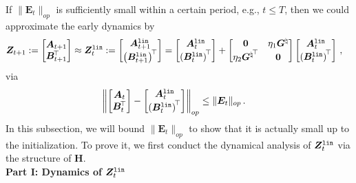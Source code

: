 If $\|\bm E_t\|_{op}$ is sufficiently small within a certain period, e.g., $t \leq T$, then we could approximate the early dynamics by
\begin{align*}
 \bm Z_{t+1} :=
    \begin{bmatrix}
       \bm A_{t+1} \\ \bm B_{t+1}^{\!\top}
    \end{bmatrix} & \approx \bm Z^{\tt lin}_t := \begin{bmatrix}
    \bm A^{\tt lin}_{t+1} \\ \left(\bm B^{\tt lin}_{t+1}\right)^{\!\top}
\end{bmatrix}=
\begin{bmatrix}
    \bm A^{\tt lin}_t \\ \left(\bm B^{\tt lin}_{t}\right)^{\!\top}
\end{bmatrix} + 
    \begin{bmatrix}
        \bm 0 & \eta_1{\bm G}^{\natural}\\
        \eta_2{{\bm G}^{\natural}}^{\!\top} & \bm 0
    \end{bmatrix} \begin{bmatrix}
    \bm A^{\tt lin}_t \\ \left(\bm B^{\tt lin}_{t}\right)^{\!\top}
\end{bmatrix}\,,
\end{align*}
via
\begin{align*}
    \left\|\begin{bmatrix}
        \bm A_t \\ \bm B_t^{\!\top}
    \end{bmatrix}-\begin{bmatrix}
        \bm A^{\tt lin}_t \\ \left(\bm B^{\tt lin}_t\right)^{\!\top}
    \end{bmatrix}\right\|_{op} & \leq \|\bm E_t\|_{op}\,.
\end{align*}
In this subsection, we will bound $\|\bm E_t\|_{op}$ to show that it is actually small up to the initialization.
To prove it, we first conduct the dynamical analysis of $\bm Z^{\tt lin}_t$ via the structure of $\bm H$.\\

\noindent
{\bf Part I: Dynamics of $\bm Z^{\tt lin}_t$}\\

